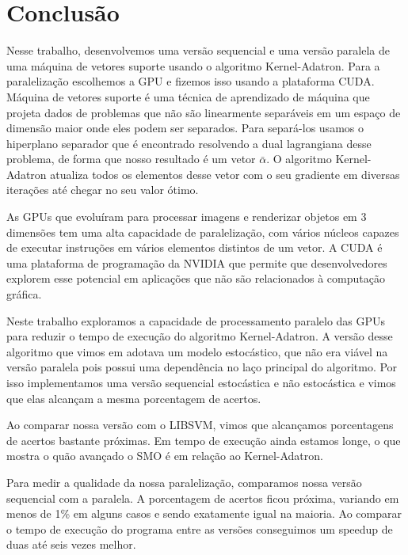 \chapter{Conclusão}\label{chp:LABEL_CHP_6}

Nesse trabalho, desenvolvemos uma versão sequencial e uma versão paralela de uma máquina de vetores suporte usando o algoritmo Kernel-Adatron. Para a paralelização escolhemos a GPU e fizemos isso usando a plataforma CUDA.
Máquina de vetores suporte é uma técnica de aprendizado de máquina que projeta dados de problemas que não são linearmente separáveis em um espaço de dimensão maior onde eles podem ser separados. Para separá-los usamos o hiperplano separador que é encontrado resolvendo a dual lagrangiana desse problema, de forma que nosso resultado é um vetor $\bar{\alpha}$. O algoritmo Kernel-Adatron atualiza todos os elementos desse vetor com o seu gradiente em diversas iterações até chegar no seu valor ótimo.

As GPUs que evoluíram para processar imagens e renderizar objetos em 3 dimensões tem uma alta capacidade de paralelização, com vários núcleos capazes de executar instruções em vários elementos distintos de um vetor. A CUDA é uma plataforma de programação da NVIDIA que permite que desenvolvedores explorem esse potencial em aplicações que não são relacionados à computação gráfica.

Neste trabalho exploramos a capacidade de processamento paralelo das GPUs para reduzir o tempo de execução do algoritmo Kernel-Adatron. A versão desse algoritmo que vimos em \cite{art:LIVRO_KAA} adotava um modelo estocástico, que não era viável na versão paralela pois possui uma dependência no laço principal do algoritmo. Por isso implementamos uma versão sequencial estocástica e não estocástica e vimos que elas alcançam a mesma porcentagem de acertos.

Ao comparar nossa versão com o LIBSVM, vimos que alcançamos porcentagens de acertos bastante próximas. Em tempo de execução ainda estamos longe, o que mostra o quão avançado o SMO é em relação ao Kernel-Adatron.

Para medir a qualidade da nossa paralelização, comparamos nossa versão sequencial com a paralela. A porcentagem de acertos ficou próxima, variando em menos de 1\% em alguns casos e sendo exatamente igual na maioria. Ao comparar o tempo de execução do programa entre as versões conseguimos um speedup de duas até seis vezes melhor.

